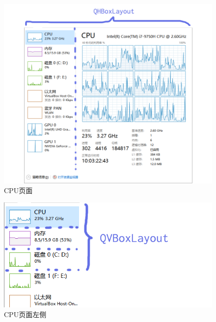 \documentclass{beamer}
\begin{document}
\begin{frame}
\begin{figure}[htb]
    \centering
    \includegraphics[scale=0.3]{../media/layout/cpupage.png}
    \caption{CPU页面}
    \label{fig:cpupage}
\end{figure}
\end{frame}

\begin{frame}
    \begin{figure}[htb]
        \centering
        \includegraphics[scale=0.6]{../media/layout/cpupage left.png}
        \caption{CPU页面左侧}
        \label{fig:cpupageleft}
    \end{figure}
\end{frame}
\end{document}
